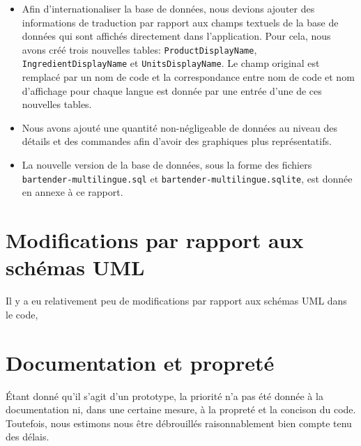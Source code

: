 \documentclass[a4paper,10pt]{article}
\begin{document}
\begin{itemize}
    \item Afin d'internationaliser la base de données, nous devions ajouter des informations de traduction par rapport aux champs textuels de la base de données qui sont affichés directement dans l'application. Pour cela, nous avons créé trois nouvelles tables: \texttt{ProductDisplayName}, \texttt{IngredientDisplayName} et \texttt{UnitsDisplayName}. Le champ original est remplacé par un nom de code et la correspondance entre nom de code et nom d'affichage pour chaque langue est donnée par une entrée d'une de ces nouvelles tables.
    \item Nous avons ajouté une quantité non-négligeable de données au niveau des détails et des commandes afin d'avoir des graphiques plus représentatifs.
    \item La nouvelle version de la base de données, sous la forme des fichiers \texttt{bartender-multilingue.sql} et \texttt{bartender-multilingue.sqlite}, est donnée en annexe à ce rapport.
\end{itemize}

\section{Modifications par rapport aux schémas UML}

Il y a eu relativement peu de modifications par rapport aux schémas UML dans le code, 

\section{Documentation et propreté}

Étant donné qu'il s'agit d'un prototype, la priorité n'a pas été donnée à la documentation ni, dans une certaine mesure, à la propreté et la concison du code. Toutefois, nous estimons nous être débrouillés raisonnablement bien compte tenu des délais.
\end{document}
